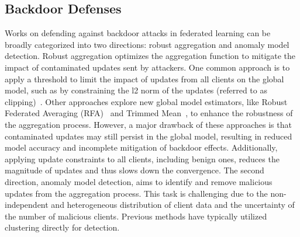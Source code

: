 \subsection{Backdoor Defenses}
Works on defending against backdoor attacks in federated learning can be broadly categorized into two directions: robust aggregation and anomaly model detection. Robust aggregation optimizes the aggregation function to mitigate the impact of contaminated updates sent by attackers. One common approach is to apply a threshold to limit the impact of updates from all clients on the global model, such as by constraining the l2 norm of the updates (referred to as clipping)~\cite{howtobackdoor,foolgold,flame,l21}. Other approaches explore new global model estimators, like Robust Federated Averaging (RFA)~\cite{RFA} and Trimmed Mean~\cite{Trimmed_Mean}, to enhance the robustness of the aggregation process. However, a major drawback of these approaches is that contaminated updates may still persist in the global model, resulting in reduced model accuracy and incomplete mitigation of backdoor effects. Additionally, applying update constraints to all clients, including benign ones, reduces the magnitude of updates and thus slows down the convergence. The second direction, anomaly model detection, aims to identify and remove malicious updates from the aggregation process. This task is challenging due to the non-independent and heterogeneous distribution of client data and the uncertainty of the number of malicious clients. Previous methods have typically utilized clustering directly for detection.
